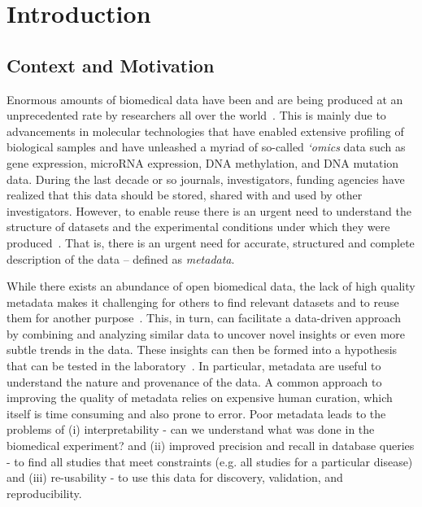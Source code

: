 \chapter{Introduction}\label{chap:intro}

\section{Context and Motivation}

Enormous amounts of biomedical data have been and are being produced at an unprecedented rate by researchers all over the world~\cite{hoffman2013use}. 
This is mainly due to advancements in molecular technologies that have enabled extensive profiling of biological samples and have unleashed a myriad of so-called \emph{`omics} data such as gene expression, microRNA expression, DNA methylation, and DNA mutation data. 
During the last decade or so journals, investigators, funding agencies have realized that this data should be stored, shared with and used by other investigators.
However, to enable reuse there is an urgent need to understand the structure of datasets and the experimental conditions under which they were produced~\cite{borgman2012conundrum}.
That is, there is an urgent need for accurate, structured and complete description of the data -- defined as \emph{metadata}.

While there exists an abundance of open biomedical data, the lack of high quality metadata makes it challenging for others to find relevant datasets and to reuse them for another purpose~\cite{gonccalves2017metadata, Hu2017}. 
This, in turn, can facilitate a data-driven approach by combining and analyzing similar data to uncover novel insights or even more subtle trends in the data.
These insights can then be formed into a hypothesis that can be tested in the laboratory~\cite{barrett2012ncbi}.
In particular, metadata are useful to understand the nature and provenance of the data. A common approach to improving the quality of metadata relies on expensive human curation, which itself is time consuming and also prone to error.
Poor metadata leads to the problems of (i) interpretability - can we understand what was done in the biomedical experiment? and (ii) improved precision and recall in database queries - to find all studies that meet constraints (e.g. all studies for a particular disease) and (iii) re-usability - to use this data for discovery, validation, and reproducibility.

